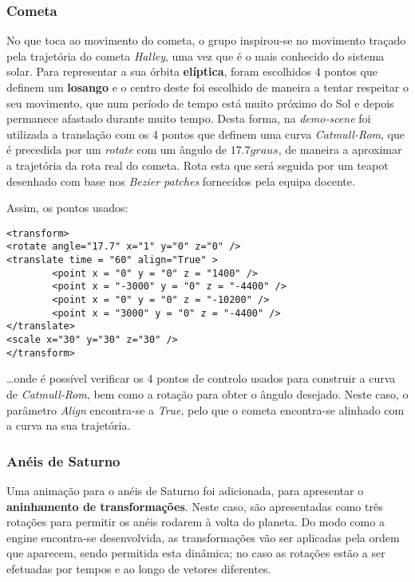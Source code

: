 \documentclass[relatorio.tex]{subfiles}
\begin{document}
\subsubsection{Cometa}
No que toca ao movimento do cometa, o grupo inspirou-se no movimento traçado pela trajetória do cometa \textit{Halley},
uma vez que é o mais conhecido do sistema solar. 
Para representar a sua órbita \textbf{elíptica}, foram escolhidos 4 pontos que definem um \textbf{losango} e o centro
deste foi escolhido de maneira a tentar respeitar o seu movimento, 
que num período de tempo está muito próximo do Sol e depois permanece afastado durante muito tempo. 
Desta forma, na \textit{demo-scene} foi utilizada a translação com os 4 pontos que definem uma curva 
\textit{Catmull-Rom}, que é precedida por um \textit{rotate} com um ângulo de $17.7graus$, de maneira a aproximar
a trajetória da rota real do cometa. 
Rota esta que será seguida por um teapot desenhado com base nos
\textit{Bezier patches} fornecidos pela equipa docente.

Assim, os pontos usados:
\begin{code}
\label{code:cometa_curva}
\begin{verbatim}
<transform>
<rotate angle="17.7" x="1" y="0" z="0" />
<translate time = "60" align="True" >
        <point x = "0" y = "0" z = "1400" />
        <point x = "-3000" y = "0" z = "-4400" />
        <point x = "0" y = "0" z = "-10200" />
        <point x = "3000" y = "0" z = "-4400" />
</translate>
<scale x="30" y="30" z="30" />
</transform>
\end{verbatim}
\end{code}
\dots onde é possível verificar os 4 pontos de controlo usados para construir a curva de \textit{Catmull-Rom}, 
bem como a rotação para obter o ângulo desejado.
Neste caso, o parâmetro \textit{Align} encontra-se a \textit{True}, pelo que o cometa encontra-se alinhado 
com a curva na sua trajetória.

\subsubsection{Anéis de Saturno}
Uma animação para o anéis de Saturno foi adicionada, para apresentar o \textbf{aninhamento de transformações}.
Neste caso, são apresentadas como três rotações para permitir os anéis rodarem à volta do planeta.
Do modo como a engine encontra-se desenvolvida, as transformações vão ser aplicadas 
pela ordem que aparecem, sendo permitida esta dinâmica; no caso as rotações estão a ser efetuadas por
tempos e ao longo de vetores diferentes.
\end{document}
